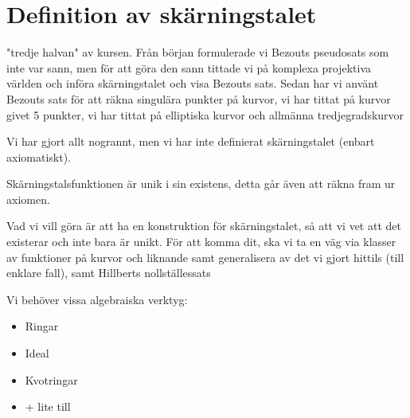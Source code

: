 \section{Definition av skärningstalet}\par
\noindent "tredje halvan" av kursen. Från början formulerade vi Bezouts pseudosats som inte var sann, men för att göra den sann tittade vi på komplexa projektiva världen och införa skärningstalet och visa Bezouts sats. Sedan har vi använt Bezouts sats för att räkna singulära punkter på kurvor, vi har tittat på kurvor givet 5 punkter, vi har tittat på elliptiska kurvor och allmänna tredjegradskurvor
\par\bigskip
\noindent Vi har gjort allt nogrannt, men vi har inte definierat skärningstalet (enbart axiomatiskt).\par
\noindent Skärningstalsfunktionen är unik i sin existens, detta går även att räkna fram ur axiomen.\par
\noindent Vad vi vill göra är att ha en konstruktion för skärningstalet, så att vi vet att det existerar och inte bara är unikt. För att komma dit, ska vi ta en väg via klasser av funktioner på kurvor och liknande samt generalisera av det vi gjort hittils (till enklare fall), samt Hillberts nollställessats
\par\bigskip
\noindent Vi behöver vissa algebraiska verktyg:\par
\begin{itemize}
  \item Ringar
  \item Ideal
  \item Kvotringar
  \item + lite till 
\end{itemize}
\par\bigskip
